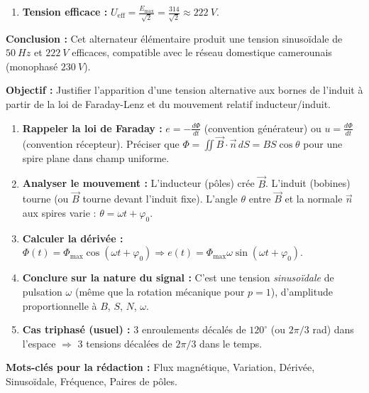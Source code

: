 \documentclass[11pt]{article}
\newcommand{\cle}[1]{{\popxbold\color{popdark}#1}}
\begin{document}
\begin{exoresolu}
\begin{enumerate}
    \item \textbf{Tension efficace :}
    $U_{\text{eff}} = \frac{E_{\text{max}}}{\sqrt{2}} = \frac{314}{\sqrt{2}} \approx \SI{222}{V}$.
\end{enumerate}
\par\medskip\noindent\textbf{Conclusion :} Cet alternateur élémentaire produit une tension sinusoïdale de $\SI{50}{Hz}$ et $\SI{222}{V}$ efficaces, compatible avec le réseau domestique camerounais (monophasé $\SI{230}{V}$).
\end{exoresolu}

\begin{methode}
    \textbf{Objectif :} Justifier l'apparition d'une tension alternative aux bornes de l'induit à partir de la loi de Faraday-Lenz et du mouvement relatif inducteur/induit.
    \begin{enumerate}
        \item \textbf{Rappeler la loi de Faraday :} $e = -\frac{d\Phi}{dt}$ (convention générateur) ou $u = \frac{d\Phi}{dt}$ (convention récepteur). Préciser que $\Phi = \iint \vec{B}\cdot\vec{n}\,dS = B S \cos\theta$ pour une spire plane dans champ uniforme.
        \item \textbf{Analyser le mouvement :} L'inducteur (pôles) crée $\vec{B}$. L'induit (bobines) tourne (ou $\vec{B}$ tourne devant l'induit fixe). L'angle $\theta$ entre $\vec{B}$ et la normale $\vec{n}$ aux spires varie : $\theta = \omega t + \varphi_0$.
        \item \textbf{Calculer la dérivée :} $\Phi(t) = \Phi_{\text{max}}\cos(\omega t + \varphi_0) \Rightarrow e(t) = \Phi_{\text{max}}\omega \sin(\omega t + \varphi_0)$.
        \item \textbf{Conclure sur la nature du signal :} C'est une tension \emph{sinusoïdale} de pulsation $\omega$ (même que la rotation mécanique pour $p=1$), d'amplitude proportionnelle à $B$, $S$, $N$, $\omega$.
        \item \textbf{Cas triphasé (usuel) :} 3 enroulements décalés de $120^\circ$ (ou $2\pi/3$ rad) dans l'espace $\Rightarrow$ 3 tensions décalées de $2\pi/3$ dans le temps.
    \end{enumerate}
    \textbf{Mots-clés pour la rédaction :} \cle{Flux magnétique}, \cle{Variation}, \cle{Dérivée}, \cle{Sinusoïdale}, \cle{Fréquence}, \cle{Paires de pôles}.
\end{methode}
\end{document}
